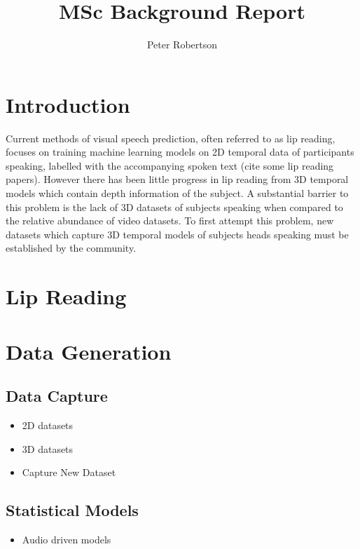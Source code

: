 \documentclass[12pt]{article}
\title{MSc Background Report}
\author{Peter Robertson}
\date{}
\begin{document}
\maketitle

\setcounter{page}{0}
\clearpage{\pagestyle{empty}\cleardoublepage}

\tableofcontents 
\clearpage{\pagestyle{empty}\cleardoublepage}


\setcounter{page}{1}

\section{Introduction}
Current methods of visual speech prediction, often referred to as lip reading, focuses on training machine learning models on 2D temporal data of participants speaking, labelled with the accompanying spoken text (cite some lip reading papers).
However there has been little progress in lip reading from 3D temporal models which contain depth information of the subject.
A substantial barrier to this problem is the lack of 3D datasets of subjects speaking when compared to the relative abundance of video datasets.
To first attempt this problem, new datasets which capture 3D temporal models of subjects heads speaking must be established by the community.

\section{Lip Reading}

\section{Data Generation}
\subsection{Data Capture}
\begin{itemize}
    \item 2D datasets
    \item 3D datasets
    \item Capture New Dataset
\end{itemize}

\subsection{Statistical Models}
\begin{itemize}
    \item Audio driven models
\end{itemize}
\end{document}
